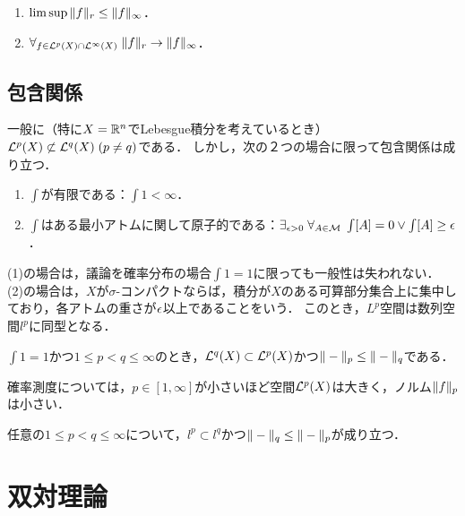 \documentclass[uplatex,dvipdfmx]{jsreport}
\begin{document}
\begin{corollary}\mbox{}
    \begin{enumerate}
        \item $\limsup\|f\|_r\le\|f\|_\infty$．
        \item $\forall_{f\in\mathcal{L}^p(X)\cap\mathcal{L}^\infty(X)}\;\|f\|_r\to\|f\|_\infty$．
    \end{enumerate}
\end{corollary}

\subsection{包含関係}

\begin{discussion}
    一般に（特に$X=\mathbb{R}^n$でLebesgue積分を考えているとき）$\mathcal{L}^p(X)\not\subset\mathcal{L}^q(X)\;(p\ne q)$である．
    しかし，次の２つの場合に限って包含関係は成り立つ．
    \begin{enumerate}
        \item $\int$が有限である：$\int 1<\infty$．
        \item $\int$はある最小アトムに関して原子的である：$\exists_{\epsilon>0}\;\forall_{A\in\mathcal{M}}\;\int[A]=0\lor\int[A]\ge\epsilon$．
    \end{enumerate}
    (1)の場合は，議論を確率分布の場合$\int 1=1$に限っても一般性は失われない．
    (2)の場合は，$X$が$\sigma$-コンパクトならば，積分が$X$のある可算部分集合上に集中しており，各アトムの重さが$\epsilon$以上であることをいう．
    このとき，$L^p$空間は数列空間$l^p$に同型となる．
\end{discussion}

\begin{corollary}
    $\int 1=1$かつ$1\le p<q\le\infty$のとき，$\mathcal{L}^q(X)\subset\mathcal{L}^p(X)$かつ$\|-\|_p\le\|-\|_q$である．
\end{corollary}
\begin{remarks}[確率空間上のLebesgue空間]
    確率測度については，$p\in[1,\infty]$が小さいほど空間$\mathcal{L}^p(X)$は大きく，ノルム$\|f\|_p$は小さい．
\end{remarks}

\begin{corollary}
    任意の$1\le p<q\le\infty$について，$l^p\subset l^q$かつ$\|-\|_q\le\|-\|_p$が成り立つ．
\end{corollary}

\section{双対理論}
\end{document}
